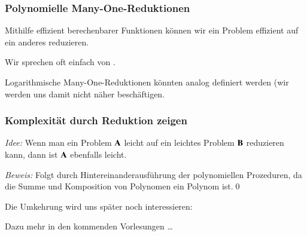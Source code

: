 \documentclass[onlymath]{beamer}
\begin{document}
\begin{frame}\frametitle{Polynomielle Many-One-Reduktionen}

Mithilfe effizient berechenbarer Funktionen können wir ein Problem
effizient auf ein anderes reduzieren.\bigskip

\pause\bigskip

Wir sprechen oft einfach von .
\bigskip

Logarithmische Many-One-Reduktionen könnten analog definiert werden (wir werden uns damit nicht näher beschäftigen.

\end{frame}

\begin{frame}\frametitle{Komplexität durch Reduktion zeigen}

\emph{Idee:} Wenn man ein Problem $\textbf{\textcolor{black}{A}}$ leicht auf ein leichtes Problem $\textbf{\textcolor{black}{B}}$ reduzieren kann,
dann ist $\textbf{\textcolor{black}{A}}$ ebenfalls leicht.\bigskip


\emph{Beweis:} Folgt durch Hintereinanderausführung der polynomiellen Prozeduren, da die Summe und Komposition von Polynomen ein Polynom ist.\qed
\bigskip\pause

Die Umkehrung wird uns später noch interessieren:

\bigskip

Dazu mehr in den kommenden Vorlesungen \ldots

\end{frame}
\end{document}
